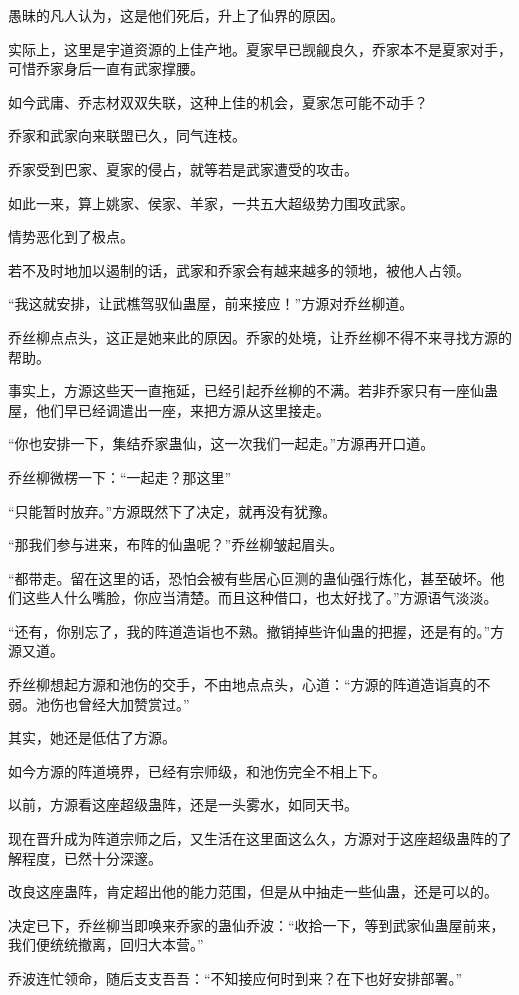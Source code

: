 \begin{this_body}
愚昧的凡人认为，这是他们死后，升上了仙界的原因。

实际上，这里是宇道资源的上佳产地。夏家早已觊觎良久，乔家本不是夏家对手，可惜乔家身后一直有武家撑腰。

如今武庸、乔志材双双失联，这种上佳的机会，夏家怎可能不动手？

乔家和武家向来联盟已久，同气连枝。

乔家受到巴家、夏家的侵占，就等若是武家遭受的攻击。

如此一来，算上姚家、侯家、羊家，一共五大超级势力围攻武家。

情势恶化到了极点。

若不及时地加以遏制的话，武家和乔家会有越来越多的领地，被他人占领。

“我这就安排，让武樵驾驭仙蛊屋，前来接应！”方源对乔丝柳道。

乔丝柳点点头，这正是她来此的原因。乔家的处境，让乔丝柳不得不来寻找方源的帮助。

事实上，方源这些天一直拖延，已经引起乔丝柳的不满。若非乔家只有一座仙蛊屋，他们早已经调遣出一座，来把方源从这里接走。

“你也安排一下，集结乔家蛊仙，这一次我们一起走。”方源再开口道。

乔丝柳微楞一下：“一起走？那这里”

“只能暂时放弃。”方源既然下了决定，就再没有犹豫。

“那我们参与进来，布阵的仙蛊呢？”乔丝柳皱起眉头。

“都带走。留在这里的话，恐怕会被有些居心叵测的蛊仙强行炼化，甚至破坏。他们这些人什么嘴脸，你应当清楚。而且这种借口，也太好找了。”方源语气淡淡。

“还有，你别忘了，我的阵道造诣也不熟。撤销掉些许仙蛊的把握，还是有的。”方源又道。

乔丝柳想起方源和池伤的交手，不由地点点头，心道：“方源的阵道造诣真的不弱。池伤也曾经大加赞赏过。”

其实，她还是低估了方源。

如今方源的阵道境界，已经有宗师级，和池伤完全不相上下。

以前，方源看这座超级蛊阵，还是一头雾水，如同天书。

现在晋升成为阵道宗师之后，又生活在这里面这么久，方源对于这座超级蛊阵的了解程度，已然十分深邃。

改良这座蛊阵，肯定超出他的能力范围，但是从中抽走一些仙蛊，还是可以的。

决定已下，乔丝柳当即唤来乔家的蛊仙乔波：“收拾一下，等到武家仙蛊屋前来，我们便统统撤离，回归大本营。”

乔波连忙领命，随后支支吾吾：“不知接应何时到来？在下也好安排部署。”


\end{this_body}
